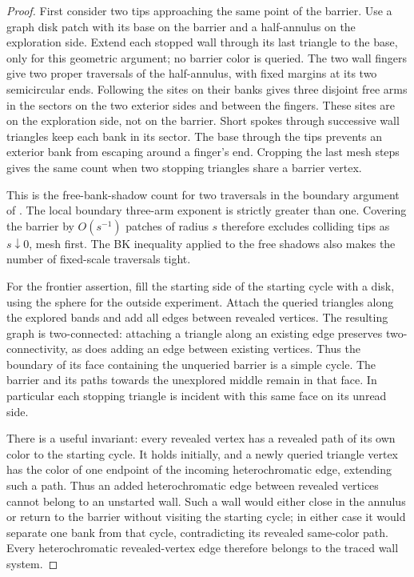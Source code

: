 \begin{proof}
First consider two tips approaching the same point of the barrier.
Use a graph disk patch with its base on the barrier and a half-annulus
on the exploration side.  Extend each stopped wall through its last
triangle to the base, only for this geometric argument; no barrier
color is queried.  The two wall fingers give two proper traversals of
the half-annulus, with fixed margins at its two semicircular ends.
Following the sites on their banks gives three disjoint free arms in
the sectors on the two exterior sides and between the fingers.  These
sites are on the exploration side, not on the barrier.  Short spokes
through successive wall triangles keep each bank in its sector.  The
base through the tips prevents an exterior bank from escaping around
a finger's end.  Cropping the last mesh steps gives the same count
when two stopping triangles share a barrier vertex.

This is the free-bank-shadow count for two traversals in the boundary
argument of \cite[Section~3]{V}.  The local boundary three-arm exponent
is strictly greater than one.  Covering the barrier by $O(s^{-1})$
patches of radius $s$ therefore excludes colliding tips as $s\downarrow0$,
mesh first.  The BK inequality applied to the free shadows also makes
the number of fixed-scale traversals tight.

For the frontier assertion, fill the starting side of the starting
cycle with a disk, using the sphere for the outside experiment.
Attach the queried triangles along the explored bands and add all
edges between revealed vertices.  The resulting graph is
two-connected: attaching a triangle along an existing edge preserves
two-connectivity, as does adding an edge between existing vertices.
Thus the boundary of its face containing the unqueried barrier is a
simple cycle.  The barrier and its paths towards the unexplored middle
remain in that face.  In particular each stopping triangle is incident
with this same face on its unread side.

There is a useful invariant: every revealed vertex has a revealed path
of its own color to the starting cycle.  It holds initially, and a newly
queried triangle vertex has the color of one endpoint of the incoming
heterochromatic edge, extending such a path.  Thus an added
heterochromatic edge between revealed vertices cannot belong to an
unstarted wall.  Such a wall would either close in the annulus or return
to the barrier without visiting the starting cycle; in either case it
would separate one bank from that cycle, contradicting its revealed
same-color path.  Every heterochromatic revealed-vertex edge therefore
belongs to the traced wall system.


\end{proof}
